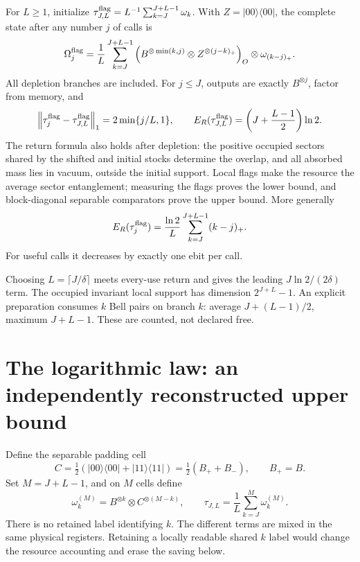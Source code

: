 \documentclass[11pt,a4paper]{article}
\numberwithin{equation}{section}
\theoremstyle{remark}
\newcommand{\ER}{E_R}
\newcommand{\normone}[1]{\left\|#1\right\|_1}
\newcommand{\proj}[1]{|#1\rangle\langle#1|}
\begin{document}
For \(L\geq1\), initialize
\(\tau_{J,L}^{\rm flag}=L^{-1}\sum_{k=J}^{J+L-1}\omega_k\).
With \(Z=\proj{00}\), the complete state after any number \(j\) of calls is
\begin{equation}
 \Omega_j^{\rm flag}=\frac1L\sum_{k=J}^{J+L-1}
 \left(B^{\otimes\min(k,j)}\otimes Z^{\otimes(j-k)_+}\right)_O
       \otimes\omega_{(k-j)_+}.                 \label{eq:flag-full}
\end{equation}
All depletion branches are included. For \(j\leq J\), outputs are exactly
\(B^{\otimes j}\), factor from memory, and
\[
 \normone{\tau_j^{\rm flag}-\tau_{J,L}^{\rm flag}}
      =2\min\{j/L,1\},\qquad
 \ER(\tau_{J,L}^{\rm flag})
      =\left(J+\frac{L-1}{2}\right)\ln2.
\]
The return formula also holds after depletion: the positive occupied
sectors shared by the shifted and initial stocks determine the overlap,
and all absorbed mass lies in vacuum, outside the initial support.
Local flags make the resource the average sector entanglement; measuring
the flags proves the lower bound, and block-diagonal separable comparators
prove the upper bound. More generally
\[
 \ER(\tau_j^{\rm flag})=\frac{\ln2}{L}
           \sum_{k=J}^{J+L-1}(k-j)_+.
\]
For useful calls it decreases by exactly one ebit per call.

Choosing \(L=\lceil J/\delta\rceil\) meets every-use return and gives the
leading \(J\ln2/(2\delta)\) term. The occupied invariant local support has
dimension \(2^{J+L}-1\). An explicit preparation consumes \(k\) Bell pairs
on branch \(k\): average \(J+(L-1)/2\), maximum \(J+L-1\).
These are counted, not declared free.

\section{The logarithmic law: an independently reconstructed upper bound}
\label{sec:mixed}
Define the separable padding cell
\[
 C=\tfrac12(\proj{00}+\proj{11})=\tfrac12(B_++B_-),\qquad B_+=B.
\]
Set \(M=J+L-1\), and on \(M\) cells define
\begin{equation}
 \omega_k^{(M)}=B^{\otimes k}\otimes C^{\otimes(M-k)},\qquad
 \tau_{J,L}=\frac1L\sum_{k=J}^{M}\omega_k^{(M)}. \label{eq:mix}
\end{equation}
There is no retained label identifying \(k\). The different terms are
mixed in the same physical registers. Retaining a locally readable shared
\(k\) label would change the resource accounting and erase the saving below.
\end{document}
